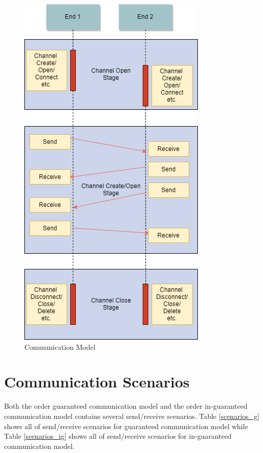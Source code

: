 \begin{figure}[h]
\centerline{\includegraphics[scale=0.6]{Figures/communicationhappen}}
 \caption{Communication Model}
\label{communicationhappen}
\end{figure}


\section{Communication Scenarios}
Both the order guaranteed communication model and the order in-guaranteed communication model contains several send/receive scenarios. Table \ref{scenarios_g} shows all of send/receive scenarios for guaranteed communication model while Table \ref{scenarios_ig} shows all of send/receive scenarios for in-guaranteed communication model.


